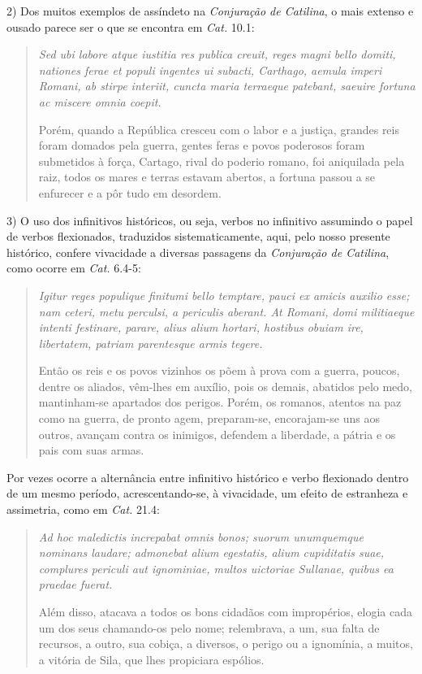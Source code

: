 2) Dos muitos exemplos de assíndeto na \emph{Conjuração de Catilina}, o mais extenso e
ousado parece ser o que se encontra em \emph{Cat.} 10.1: \begin{quote} \emph{Sed ubi
  labore atque iustitia res publica creuit, reges magni bello domiti, nationes
ferae et populi ingentes ui subacti, Carthago, aemula imperi Romani, ab stirpe
interiit, cuncta maria terraeque patebant, saeuire fortuna ac miscere omnia
coepit.}

Porém, quando a República cresceu com o labor e a justiça, grandes reis foram
domados pela guerra, gentes feras e povos poderosos foram submetidos à força,
Cartago, rival do poderio romano, foi aniquilada pela raiz, todos os mares e
terras estavam abertos, a fortuna passou a se enfurecer e a pôr tudo em
desordem.  \end{quote} 


3) O uso dos infinitivos históricos, ou seja, verbos no
infinitivo assumindo o papel de verbos flexionados, traduzidos
sistematicamente, aqui, pelo nosso presente histórico, confere vivacidade a
diversas passagens da \emph{Conjuração de Catilina}, como ocorre em \emph{Cat.} 6.4-5:
\begin{quote} \emph{Igitur reges populique finitumi bello temptare, pauci ex
  amicis auxilio esse; nam ceteri, metu perculsi, a periculis aberant. At
Romani, domi militiaeque intenti festinare, parare, alius alium hortari,
hostibus obuiam ire, libertatem, patriam parentesque armis tegere.}

Então os reis e os povos vizinhos os põem à prova com a guerra, poucos, dentre
os aliados, vêm-lhes em auxílio, pois os demais, abatidos pelo medo,
mantinham-se apartados dos perigos. Porém, os romanos, atentos na paz como
na guerra, de pronto agem, preparam-se, encorajam-se uns aos outros, avançam
contra os inimigos, defendem a liberdade, a pátria e os pais com suas armas.
\end{quote} 


Por vezes ocorre a alternância entre infinitivo histórico e verbo
flexionado dentro de um mesmo período, acrescentando-se, à vivacidade, um
efeito de estranheza e assimetria, como em \emph{Cat.} 21.4: \begin{quote} \emph{Ad hoc
  maledictis increpabat omnis bonos; suorum unumquemque nominans laudare;
admonebat alium egestatis, alium cupiditatis suae, complures periculi aut
ignominiae, multos uictoriae Sullanae, quibus ea praedae fuerat.} 

Além disso,
atacava a todos os bons cidadãos com impropérios, elogia cada um dos seus
chamando-os pelo nome; relembrava, a um, sua falta de recursos, a outro, sua
cobiça, a diversos, o perigo ou a ignomínia, a muitos, a vitória de Sila, que
lhes propiciara espólios.  \end{quote} 

